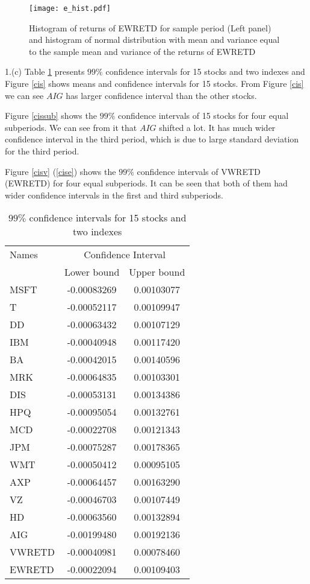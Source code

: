 \documentclass[11pt]{article}
\begin{document}
\begin{figure}
\centering
\texttt{[image: e\_hist.pdf]}
\caption{Histogram of returns of EWRETD for sample period (Left panel) and histogram of normal distribution with mean and variance equal to the sample mean and variance of the returns of EWRETD}
\label{ehist}
\end{figure}

1.(c)
Table \ref{tab2} presents $99\%$ confidence intervals for 15 stocks and two indexes and Figure \ref{cis} shows means and confidence intervals for 15 stocks. From Figure \ref{cis} we can see $AIG$ has larger confidence interval than the other stocks.

Figure \ref{cissub} shows the $99\%$ confidence intervals of 15 stocks for four equal subperiods. We can see from it that $AIG$ shifted a lot. It has much wider confidence interval in the third period, which is due to large standard deviation for the third period.

Figure \ref{cisv} (\ref{cise}) shows the $99\%$ confidence intervals of VWRETD (EWRETD) for four equal subperiods. It can be seen that both of them had wider confidence intervals in the first and third subperiods.

\begin{table}
\centering
\begin{tabular}{lcc}
  \hline
Names &\multicolumn{2}{c}{Confidence Interval}\\
 & Lower bound & Upper bound \\ 
  \hline
MSFT & -0.00083269 & 0.00103077 \\ 
  T & -0.00052117 & 0.00109947 \\ 
  DD & -0.00063432 & 0.00107129 \\ 
  IBM & -0.00040948 & 0.00117420 \\ 
  BA & -0.00042015 & 0.00140596 \\ 
  MRK & -0.00064835 & 0.00103301 \\ 
  DIS & -0.00053131 & 0.00134386 \\ 
  HPQ & -0.00095054 & 0.00132761 \\ 
  MCD & -0.00022708 & 0.00121343 \\ 
  JPM & -0.00075287 & 0.00178365 \\ 
  WMT & -0.00050412 & 0.00095105 \\ 
  AXP & -0.00064457 & 0.00163290 \\ 
  VZ & -0.00046703 & 0.00107449 \\ 
  HD & -0.00063560 & 0.00132894 \\ 
  AIG & -0.00199480 & 0.00192136 \\ 
  VWRETD & -0.00040981 & 0.00078460 \\ 
  EWRETD & -0.00022094 & 0.00109403 \\ 
   \hline
\end{tabular}
\caption{$99\%$ confidence intervals for 15 stocks and two indexes}\label{tab2}
\end{table}
\end{document}
